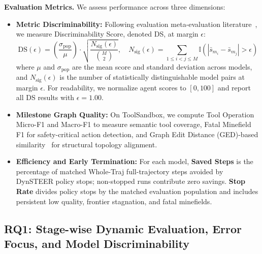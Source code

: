 \textbf{Evaluation Metrics.} We assess performance across three dimensions:
\begin{itemize}[leftmargin=*,itemsep=1.5pt,topsep=1pt]
    \item \textbf{Metric Discriminability:} Following evaluation meta-evaluation literature~\citep{sakai2006evaluating,sakai2014statistical,carterette2012multiple,zheng2023judging}, we measure Discriminability Score, denoted DS, at margin $\epsilon$:
    \begin{equation}
        \text{DS}(\epsilon) = \left( \frac{\sigma_{\text{pop}}}{\mu} \right) \cdot \sqrt{\frac{N_{\text{sig}}(\epsilon)}{\binom{M}{2}}}, \quad N_{\text{sig}}(\epsilon) = \sum_{1 \le i < j \le M} \mathbb{I}\left( |\bar{s}_{m_i} - \bar{s}_{m_j}| > \epsilon \right)
        \label{eq:ds}
    \end{equation}
    where $\mu$ and $\sigma_{\text{pop}}$ are the mean score and standard deviation across models, and $N_{\text{sig}}(\epsilon)$ is the number of statistically distinguishable model pairs at margin $\epsilon$. For readability, we normalize agent scores to $[0, 100]$ and report all DS results with $\epsilon = 1.00$.
    \item \textbf{Milestone Graph Quality:} On ToolSandbox, we compute Tool Operation Micro-F1 and Macro-F1 to measure semantic tool coverage, Fatal Minefield F1 for safety-critical action detection, and Graph Edit Distance (GED)-based similarity~\citep{sanfeliu1983distance} for structural topology alignment.
    \item \textbf{Efficiency and Early Termination:} For each model, \textbf{Saved Steps} is the percentage of matched Whole-Traj full-trajectory steps avoided by DynSTEER policy stops; non-stopped runs contribute zero savings. \textbf{Stop Rate} divides policy stops by the matched evaluation population and includes persistent low quality, frontier stagnation, and fatal minefields.\end{itemize}

\subsection{RQ1: Stage-wise Dynamic Evaluation, Error Focus, and Model Discriminability}
\label{sec:exp_rq1}



